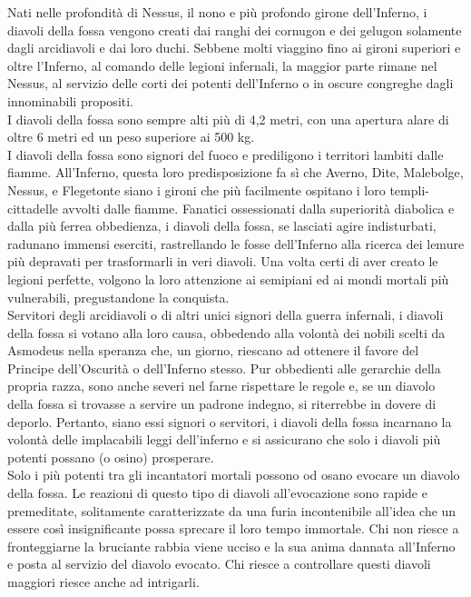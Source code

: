 \begin{multicols}{2}
Nati nelle profondità di Nessus, il nono e più profondo girone dell’Inferno, i diavoli della fossa vengono creati dai ranghi dei cornugon e dei gelugon solamente dagli arcidiavoli e dai loro duchi. Sebbene molti viaggino fino ai gironi superiori e oltre l’Inferno, al comando delle legioni infernali, la maggior parte rimane nel Nessus, al servizio delle corti dei potenti dell’Inferno o in oscure congreghe dagli innominabili propositi.\\

I diavoli della fossa sono sempre alti più di 4,2 metri, con una apertura alare di oltre 6 metri ed un peso superiore ai 500 kg.\\

I diavoli della fossa sono signori del fuoco e prediligono i territori lambiti dalle fiamme. All’Inferno, questa loro predisposizione fa sì che Averno, Dite, Malebolge, Nessus, e Flegetonte siano i gironi che più facilmente ospitano i loro templi-cittadelle avvolti dalle fiamme. Fanatici ossessionati dalla superiorità diabolica e dalla più ferrea obbedienza, i diavoli della fossa, se lasciati agire indisturbati, radunano immensi eserciti, rastrellando le fosse dell’Inferno alla ricerca dei lemure più depravati per trasformarli in veri diavoli. Una volta certi di aver creato le legioni perfette, volgono la loro attenzione ai semipiani ed ai mondi mortali più vulnerabili, pregustandone la conquista.\\

Servitori degli arcidiavoli o di altri unici signori della guerra infernali, i diavoli della fossa si votano alla loro causa, obbedendo alla volontà dei nobili scelti da Asmodeus nella speranza che, un giorno, riescano ad ottenere il favore del Principe dell’Oscurità o dell’Inferno stesso. Pur obbedienti alle gerarchie della propria razza, sono anche severi nel farne rispettare le regole e, se un diavolo della fossa si trovasse a servire un padrone indegno, si riterrebbe in dovere di deporlo. Pertanto, siano essi signori o servitori, i diavoli della fossa incarnano la volontà delle implacabili leggi dell’inferno e si assicurano che solo i diavoli più potenti possano (o osino) prosperare.\\

Solo i più potenti tra gli incantatori mortali possono od osano evocare un diavolo della fossa. Le reazioni di questo tipo di diavoli all'evocazione sono rapide e premeditate, solitamente caratterizzate da una furia incontenibile all'idea che un essere così insignificante possa sprecare il loro tempo immortale. Chi non riesce a fronteggiarne la bruciante rabbia viene ucciso e la sua anima dannata all'Inferno e posta al servizio del diavolo evocato. Chi riesce a controllare questi diavoli maggiori riesce anche ad intrigarli.\\


\end{multicols}
